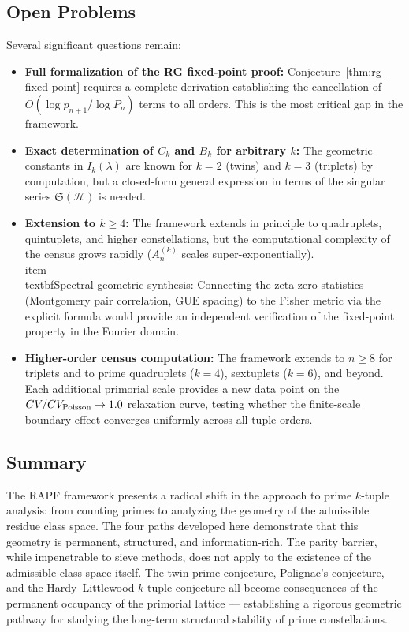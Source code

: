 \documentclass[11pt]{article}
\theoremstyle{remark}
\begin{document}
\subsection*{Open Problems}
Several significant questions remain:
\begin{itemize}
    \item \textbf{Full formalization of the RG fixed-point proof:}
    Conjecture~\ref{thm:rg-fixed-point} requires a complete derivation
    establishing the cancellation of $O(\log p_{n+1}/\log P_n)$ terms to
    all orders. This is the most critical gap in the framework.
    \item \textbf{Exact determination of $C_k$ and $B_k$ for arbitrary $k$:}
    The geometric constants in $I_k(\lambda)$ are known for $k=2$
    (twins) and $k=3$ (triplets) by computation, but a closed-form
    general expression in terms of the singular series
    $\mathfrak{S}(\mathcal{H})$ is needed.
    \item \textbf{Extension to $k \geq 4$:} The framework extends in
    principle to quadruplets, quintuplets, and higher constellations,
    but the computational complexity of the census grows rapidly
    ($A_n^{(k)}$ scales super-exponentially).
    \\item \\textbf{Spectral-geometric synthesis:} Connecting the
    zeta zero statistics (Montgomery pair correlation, GUE spacing)
    to the Fisher metric via the explicit formula would provide an
    independent verification of the fixed-point property in the
    Fourier domain.
    \item \textbf{Higher-order census computation:} The framework extends
    to $n \geq 8$ for triplets and to prime quadruplets ($k=4$), sextuplets
    ($k=6$), and beyond. Each additional primorial scale provides a new
    data point on the $CV/CV_{\rm Poisson} \to 1.0$ relaxation curve,
    testing whether the finite-scale boundary effect converges uniformly
    across all tuple orders.
\end{itemize}

\subsection*{Summary}

The RAPF framework presents a radical shift in the approach to prime
$k$-tuple analysis: from counting primes to analyzing the geometry of
the admissible residue class space. The four paths developed here
demonstrate that this geometry is permanent, structured, and
information-rich. The parity barrier, while impenetrable to sieve methods,
does not apply to the existence of the admissible class space itself.
The twin prime conjecture, Polignac's conjecture, and the Hardy--Littlewood
$k$-tuple conjecture all become consequences of the permanent occupancy
of the primorial lattice --- establishing a rigorous geometric pathway
for studying the long-term structural stability of prime constellations.
\end{document}
